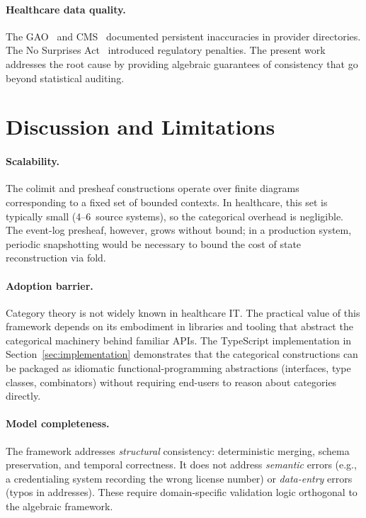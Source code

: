 \documentclass[11pt,a4paper]{article}
\begin{document}
\paragraph{Healthcare data quality.}
The GAO~\citep{gao2018} and CMS~\citep{cms2018} documented persistent
inaccuracies in provider directories. The No Surprises
Act~\citep{nosurprisesact2022} introduced regulatory penalties. The present
work addresses the root cause by providing algebraic guarantees of
consistency that go beyond statistical auditing.

\section{Discussion and Limitations}
\label{sec:discussion}

\paragraph{Scalability.}
The colimit and presheaf constructions operate over finite diagrams
corresponding to a fixed set of bounded contexts. In healthcare, this
set is typically small (4--6~source systems), so the categorical
overhead is negligible. The event-log presheaf, however, grows without
bound; in a production system, periodic snapshotting would be necessary
to bound the cost of state reconstruction via fold.

\paragraph{Adoption barrier.}
Category theory is not widely known in healthcare IT. The practical
value of this framework depends on its embodiment in libraries and
tooling that abstract the categorical machinery behind familiar APIs.
The TypeScript implementation in Section~\ref{sec:implementation}
demonstrates that the categorical constructions can be packaged as
idiomatic functional-programming abstractions (interfaces, type
classes, combinators) without requiring end-users to reason about
categories directly.

\paragraph{Model completeness.}
The framework addresses \emph{structural} consistency: deterministic
merging, schema preservation, and temporal correctness. It does not
address \emph{semantic} errors (e.g., a credentialing system recording
the wrong license number) or \emph{data-entry} errors (typos in
addresses). These require domain-specific validation logic orthogonal
to the algebraic framework.
\end{document}

